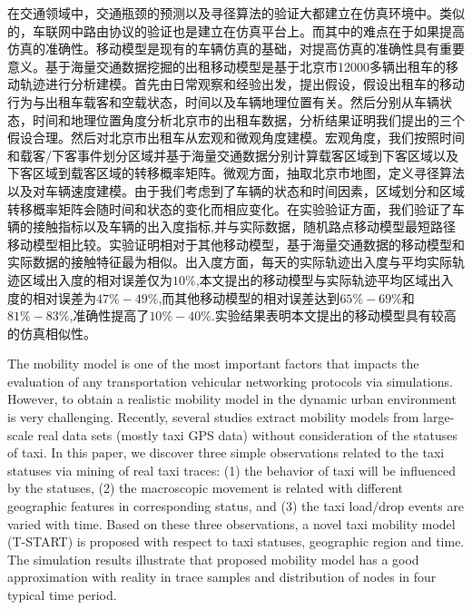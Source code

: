 
\begin{cabstract}
在交通领域中，交通瓶颈的预测以及寻径算法的验证大都建立在仿真环境中。类似的，车联网中路由协议的验证也是建立在仿真平台上。而其中的难点在于如果提高仿真的准确性。移动模型是现有的车辆仿真的基础，对提高仿真的准确性具有重要意义。基于海量交通数据挖掘的出租移动模型是基于北京市12000多辆出租车的移动轨迹进行分析建模。首先由日常观察和经验出发，提出假设，假设出租车的移动行为与出租车载客和空载状态，时间以及车辆地理位置有关。然后分别从车辆状态，时间和地理位置角度分析北京市的出租车数据，分析结果证明我们提出的三个假设合理。然后对北京市出租车从宏观和微观角度建模。宏观角度，我们按照时间和载客/下客事件划分区域并基于海量交通数据分别计算载客区域到下客区域以及下客区域到载客区域的转移概率矩阵。微观方面，抽取北京市地图，定义寻径算法以及对车辆速度建模。由于我们考虑到了车辆的状态和时间因素，区域划分和区域转移概率矩阵会随时间和状态的变化而相应变化。在实验验证方面，我们验证了车辆的接触指标以及车辆的出入度指标,并与实际数据，随机路点移动模型最短路径移动模型相比较。实验证明相对于其他移动模型，基于海量交通数据的移动模型和实际数据的接触特征最为相似。出入度方面，每天的实际轨迹出入度与平均实际轨迹区域出入度的相对误差仅为$10\%$,本文提出的移动模型与实际轨迹平均区域出入度的相对误差为$47\%-49\%$,而其他移动模型的相对误差达到$65\%-69\%$和$81\%-83\%$,准确性提高了$10\%-40\%$.实验结果表明本文提出的移动模型具有较高的仿真相似性。

\end{cabstract}

\begin{eabstract}
The mobility model is one of the most important factors that impacts the evaluation of any transportation vehicular networking protocols via simulations. However, to obtain a realistic mobility model in the dynamic urban environment is very challenging. Recently, several studies extract mobility models from large-scale real data sets (mostly taxi GPS data) without consideration of the statuses of taxi. In this paper, we discover three simple observations related to the taxi statuses via mining of real taxi traces: (1) the behavior of taxi will be influenced by the statuses, (2) the macroscopic movement is related with different geographic features in corresponding status, and (3) the taxi load/drop events are varied with time. 
Based on these three observations, a novel taxi mobility model (T-START) is proposed with respect to taxi statuses, geographic region and time. The simulation results illustrate that proposed mobility model has a good approximation with reality in trace samples and distribution of nodes in four typical time period.
\end{eabstract}